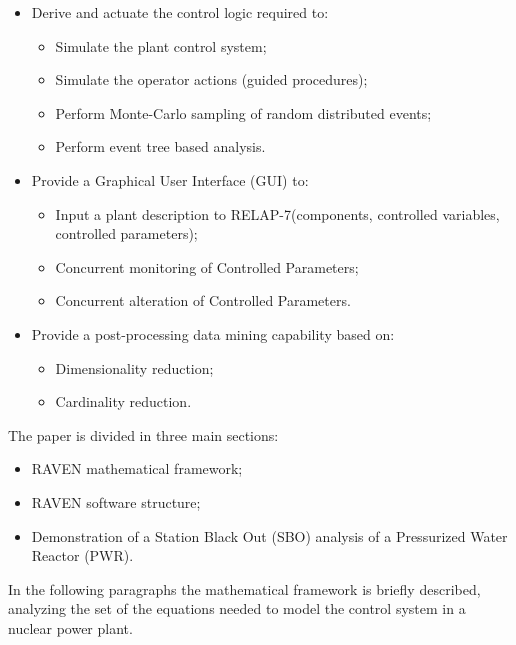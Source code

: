 \documentclass{mc2013}
\begin{document}
\begin{itemize}
\item Derive and actuate the control logic required to:
\begin{itemize}
\item Simulate the plant control system;
\item Simulate the operator actions (guided procedures);
\item Perform Monte-Carlo sampling of random distributed events;
\item Perform event tree based analysis.
\end{itemize}

\item Provide a Graphical User Interface (GUI) to:
\begin{itemize}
\item Input a plant description to RELAP-7(components, controlled variables, controlled
parameters);
\item Concurrent monitoring of Controlled Parameters;
\item Concurrent alteration of Controlled Parameters.
\end{itemize}

\item Provide a post-processing data mining capability based on:
\begin{itemize}
\item Dimensionality reduction;
\item Cardinality reduction.
\end{itemize}

\end{itemize}

The paper is divided in three main sections:
\begin{itemize}
\item RAVEN mathematical framework;
\item RAVEN software structure;
\item Demonstration of a Station Black Out (SBO) analysis of a Pressurized Water Reactor (PWR).
\end{itemize}


\label{sec:mathFramework}
In the following paragraphs the mathematical framework is briefly described, analyzing the set of the
equations needed to model the control system in a nuclear power plant.

\label{sec:PlantControlModel}
\end{document}
